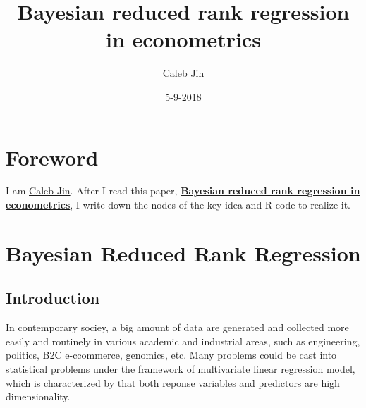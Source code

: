 \documentclass[]{book}
\title{Bayesian reduced rank regression in econometrics}
\author{Caleb Jin}
\date{5-9-2018}
\begin{document}
\maketitle

{
\setcounter{tocdepth}{1}
\tableofcontents
}
\hypertarget{foreword}{%
\chapter{Foreword}\label{foreword}}

I am \href{https://www.sjin.name/}{Caleb Jin}. After I read this paper, \textbf{\href{https://www.sciencedirect.com/science/article/pii/0304407695017739}{Bayesian reduced rank regression in econometrics}}\citep{Geweke}, I write down the nodes of the key idea and R code to realize it.

\newcommand\T{{\top}}
\newcommand\ubeta{{\boldsymbol \beta}}
\newcommand\uSigma{{\boldsymbol \Sigma}}
\newcommand\uepsilon{{\boldsymbol \epsilon}}
\newcommand\umu{{\boldsymbol \mu}}
\newcommand\utheta{{\boldsymbol \theta}}
\newcommand\bg{{\boldsymbol \gamma}}
\newcommand\uphi{{\boldsymbol \phi}}
\newcommand\0{{\bf 0}}
\newcommand\uA{{\bf A}}
\newcommand\ua{{\bf a}}
\newcommand\uB{{\bf B}}
\newcommand\ub{{\bf b}}
\newcommand\uC{{\bf C}}
\newcommand\uD{{\bf D}}
\newcommand\uE{{\bf E}}
\newcommand\ue{{\bf e}}
\newcommand\uH{{\bf H}}
\newcommand\uI{{\bf I}}
\newcommand\uM{{\bf M}}
\newcommand\uQ{{\bf Q}}
\newcommand\uV{{\bf V}}
\newcommand\uX{{\bf X}}
\newcommand\ux{{\bf x}}
\newcommand\uY{{\bf Y}}
\newcommand\uy{{\bf y}}
\newcommand\uz{{\bf z}}
\newcommand\diag{{\rm diag}}

\hypertarget{bayesian-reduced-rank-regression}{%
\chapter{Bayesian Reduced Rank Regression}\label{bayesian-reduced-rank-regression}}

\hypertarget{introduction}{%
\section{Introduction}\label{introduction}}

In contemporary sociey, a big amount of data are generated and collected more easily and routinely in various academic and industrial areas, such as engineering, politics, B2C e-ccommerce, genomics, etc. Many problems could be cast into statistical problems under the framework of multivariate linear regression model, which is characterized by that both reponse variables and predictors are high dimensionality.
\end{document}
